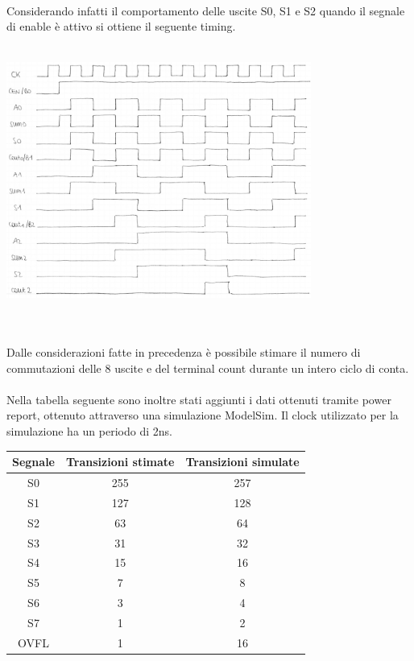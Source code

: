\documentclass[11pt,  english, makeidx, a4paper, titlepage, oneside]{book}
\begin{document}
\\\\\\\\\\\\\\\\\\\\\\\\\\
Considerando infatti il comportamento delle uscite S0, S1 e S2 quando il segnale di 
enable è attivo si ottiene il seguente timing.
\\\\
\centerline{\includegraphics[width=10cm]{./img/Lab_1/Es_5/Contatore.png}}
\\\\
Dalle considerazioni fatte in precedenza è possibile stimare il numero
di commutazioni delle 8 uscite e del terminal count durante 
un intero ciclo di conta.
\\\\Nella tabella seguente sono inoltre stati
aggiunti i dati ottenuti tramite power report, ottenuto attraverso 
una simulazione ModelSim. Il clock utilizzato per la simulazione ha un periodo
di 2ns.
\\
\begin{center}
	\begin{tabular}{|c|c|c|}
	\hline
	Segnale & Transizioni stimate & Transizioni simulate \\ 
	\hline
	S0 & 255 & 257 \\
	\hline
	S1 & 127 & 128\\
	\hline
	S2 & 63 & 64\\
	\hline
	S3 & 31 & 32\\
	\hline
	S4 & 15 & 16 \\
	\hline
	S5 & 7 & 8 \\
	\hline
	S6 & 3 & 4 \\
	\hline
	S7 & 1 & 2 \\
	\hline
	OVFL & 1 & 16 \\
	\hline
	\end{tabular}
\end{center}
\end{document}

